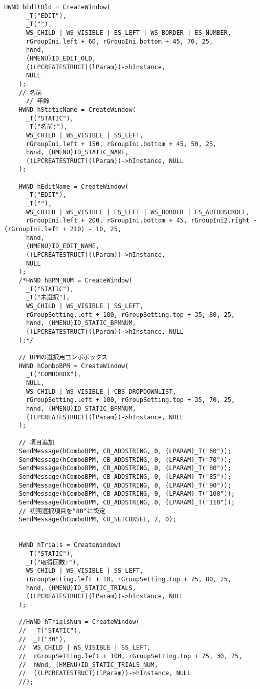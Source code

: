 \begin{lstlisting}[caption=window.cpp]
    HWND hEditOld = CreateWindow(
      _T("EDIT"),
      _T(""),
      WS_CHILD | WS_VISIBLE | ES_LEFT | WS_BORDER | ES_NUMBER,
      rGroupIni.left + 60, rGroupIni.bottom + 45, 70, 25,
      hWnd,
      (HMENU)ID_EDIT_OLD,
      ((LPCREATESTRUCT)(lParam))->hInstance,
      NULL
    );
    // 名前
      // 年齢
    HWND hStaticName = CreateWindow(
      _T("STATIC"),
      _T("名前:"),
      WS_CHILD | WS_VISIBLE | SS_LEFT,
      rGroupIni.left + 150, rGroupIni.bottom + 45, 50, 25,
      hWnd, (HMENU)ID_STATIC_NAME,
      ((LPCREATESTRUCT)(lParam))->hInstance, NULL
    );

    HWND hEditName = CreateWindow(
      _T("EDIT"),
      _T(""),
      WS_CHILD | WS_VISIBLE | ES_LEFT | WS_BORDER | ES_AUTOHSCROLL,
      rGroupIni.left + 200, rGroupIni.bottom + 45, rGroupIni2.right - (rGroupIni.left + 210) - 10, 25,
      hWnd,
      (HMENU)ID_EDIT_NAME,
      ((LPCREATESTRUCT)(lParam))->hInstance,
      NULL
    );
    /*HWND hBPM_NUM = CreateWindow(
      _T("STATIC"),
      _T("未選択"),
      WS_CHILD | WS_VISIBLE | SS_LEFT,
      rGroupSetting.left + 100, rGroupSetting.top + 35, 80, 25,
      hWnd, (HMENU)ID_STATIC_BPMNUM,
      ((LPCREATESTRUCT)(lParam))->hInstance, NULL
    );*/

    // BPMの選択用コンボボックス
    HWND hComboBPM = CreateWindow(
      _T("COMBOBOX"),
      NULL,
      WS_CHILD | WS_VISIBLE | CBS_DROPDOWNLIST,
      rGroupSetting.left + 100, rGroupSetting.top + 35, 70, 25,
      hWnd, (HMENU)ID_STATIC_BPMNUM,
      ((LPCREATESTRUCT)(lParam))->hInstance, NULL
    );

    // 項目追加
    SendMessage(hComboBPM, CB_ADDSTRING, 0, (LPARAM)_T("60"));
    SendMessage(hComboBPM, CB_ADDSTRING, 0, (LPARAM)_T("70"));
    SendMessage(hComboBPM, CB_ADDSTRING, 0, (LPARAM)_T("80"));
    SendMessage(hComboBPM, CB_ADDSTRING, 0, (LPARAM)_T("85"));
    SendMessage(hComboBPM, CB_ADDSTRING, 0, (LPARAM)_T("90"));
    SendMessage(hComboBPM, CB_ADDSTRING, 0, (LPARAM)_T("100"));
    SendMessage(hComboBPM, CB_ADDSTRING, 0, (LPARAM)_T("110"));
    // 初期選択項目を"80"に設定
    SendMessage(hComboBPM, CB_SETCURSEL, 2, 0);


    HWND hTrials = CreateWindow(
      _T("STATIC"),
      _T("取得回数:"),
      WS_CHILD | WS_VISIBLE | SS_LEFT,
      rGroupSetting.left + 10, rGroupSetting.top + 75, 80, 25,
      hWnd, (HMENU)ID_STATIC_TRIALS,
      ((LPCREATESTRUCT)(lParam))->hInstance, NULL
    );

    //HWND hTrialsNum = CreateWindow(
    //	_T("STATIC"),
    //	_T("30"),
    //	WS_CHILD | WS_VISIBLE | SS_LEFT,
    //	rGroupSetting.left + 100, rGroupSetting.top + 75, 30, 25,
    //	hWnd, (HMENU)ID_STATIC_TRIALS_NUM,
    //	((LPCREATESTRUCT)(lParam))->hInstance, NULL
    //);


\end{lstlisting}
